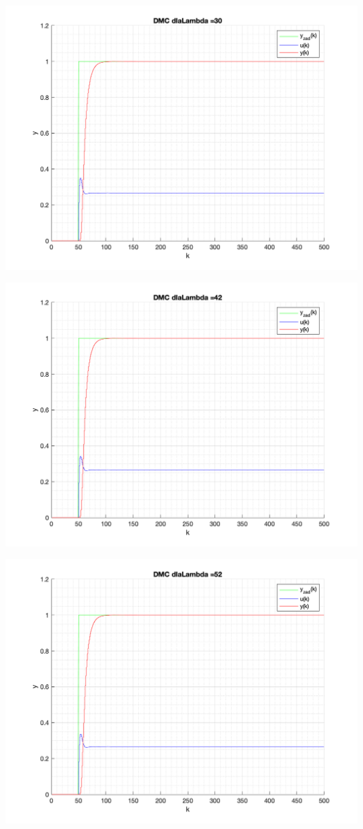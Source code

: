 \documentclass[a4paper, 11pt]{article}
\begin{document}
\begin{enumerate}
 \includegraphics[width=\linewidth]{./ModelsP4_Lambda/P4_DMC_Lambda_30_png.png} 
 
 \includegraphics[width=\linewidth]{./ModelsP4_Lambda/P4_DMC_Lambda_42_png.png} 
 
 \includegraphics[width=\linewidth]{./ModelsP4_Lambda/P4_DMC_Lambda_52_png.png} 
 

\end{enumerate}
\end{document}
